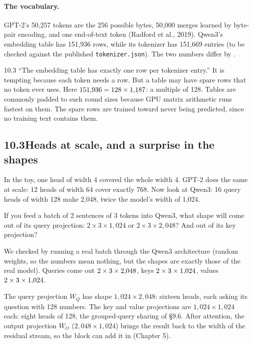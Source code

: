 \paragraph{The vocabulary.} GPT-2's 50{,}257 tokens are the 256 possible bytes, 50{,}000 merges learned by
byte-pair encoding, and one end-of-text token (Radford et al., 2019). Qwen3's embedding table has 151{,}936
rows, while its tokenizer has 151{,}669 entries (to be checked against the published \texttt{tokenizer.json}).
The two numbers differ by \nTenQwenPadRows.

\begin{wrongidea}{10.3}
``The embedding table has exactly one row per tokenizer entry.'' It is tempting because each token needs a row.
But a table may have spare rows that no token ever uses. Here $151{,}936 = 128\times1{,}187$:
a multiple of 128. Tables are commonly padded to such round sizes because GPU matrix arithmetic runs fastest on
them. The spare rows are trained toward never being predicted, since no training text contains them.
\end{wrongidea}


\subsection*{10.3\quad Heads at scale, and a surprise in the shapes}

In the toy, one head of width 4 covered the whole width 4. GPT-2 does the same at scale: 12 heads of width
64 cover exactly 768. Now look at Qwen3: 16 query heads of width 128 make 2{,}048, twice the model's width of
1{,}024.

\Predict If you feed a batch of 2 sentences of 3 tokens into Qwen3, what shape will come out of its query
projection: $2\times3\times1{,}024$ or $2\times3\times2{,}048$? And out of its key projection?

We checked by running a real batch through the Qwen3 architecture (random weights, so the numbers mean nothing,
but the shapes are exactly those of the real model). Queries come out $2\times3\times2{,}048$, keys
$2\times3\times1{,}024$, values $2\times3\times1{,}024$.

\Exactly The query projection $W_Q$ has shape $1{,}024\times2{,}048$: sixteen heads, each asking its question with
128 numbers. The key and value projections are $1{,}024\times1{,}024$ each: eight heads of 128, the grouped-query
sharing of \S9.6. After attention, the output projection $W_O$ ($2{,}048\times1{,}024$) brings the result back to
the width of the residual stream, so the block can add it in (Chapter 5).

